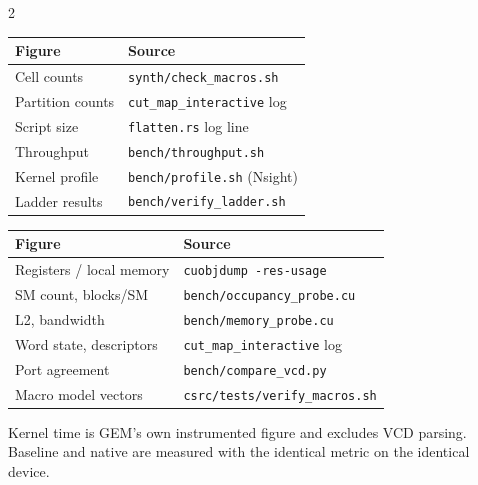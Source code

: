 \documentclass[11pt]{article}
\newcommand{\code}[1]{\texttt{\small #1}}
\begin{document}
\begin{center}\footnotesize
\begin{multicols}{2}
\begin{tabular}{@{}ll@{}}
\toprule
Figure & Source\\
\midrule
Cell counts        & \code{synth/check\_macros.sh}\\
Partition counts   & \code{cut\_map\_interactive} log\\
Script size        & \code{flatten.rs} log line\\
Throughput         & \code{bench/throughput.sh}\\
Kernel profile     & \code{bench/profile.sh} (Nsight)\\
Ladder results     & \code{bench/verify\_ladder.sh}\\
\bottomrule
\end{tabular}

\begin{tabular}{@{}ll@{}}
\toprule
Figure & Source\\
\midrule
Registers / local memory & \code{cuobjdump -res-usage}\\
SM count, blocks/SM      & \code{bench/occupancy\_probe.cu}\\
L2, bandwidth            & \code{bench/memory\_probe.cu}\\
Word state, descriptors  & \code{cut\_map\_interactive} log\\
Port agreement           & \code{bench/compare\_vcd.py}\\
Macro model vectors      & \code{csrc/tests/verify\_macros.sh}\\
\bottomrule
\end{tabular}
\end{multicols}
\end{center}

\noindent Kernel time is GEM's own instrumented figure and excludes VCD parsing.
Baseline and native are measured with the identical metric on the identical device.
\end{document}
